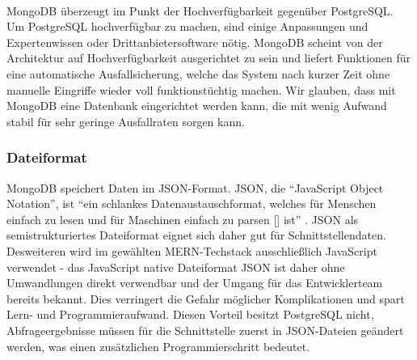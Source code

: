 \paragraph{}
MongoDB überzeugt im Punkt der Hochverfügbarkeit gegenüber PostgreSQL. Um PostgreSQL hochverfügbar zu machen, sind einige Anpassungen und Expertenwissen oder Drittanbietersoftware nötig. MongoDB scheint von der Architektur auf Hochverfügbarkeit ausgerichtet zu sein und liefert Funktionen für eine automatische Ausfallsicherung, welche das System nach kurzer Zeit ohne manuelle Eingriffe wieder voll funktionstüchtig machen. Wir glauben, dass mit MongoDB eine Datenbank eingerichtet werden kann, die mit wenig Aufwand stabil für sehr geringe Ausfallraten sorgen kann.

\subsubsection{Dateiformat}
MongoDB speichert Daten im JSON-Format. JSON, die \enquote{JavaScript Object Notation}, ist \enquote{ein schlankes Datenaustauschformat, welches für Menschen einfach zu lesen und für Maschinen einfach zu parsen [] ist} \cite{JSON1}. JSON als semistrukturiertes Dateiformat eignet sich daher gut für Schnittstellendaten.\\
Desweiteren wird im gewählten MERN-Techstack ausschließlich JavaScript verwendet - das JavaScript native Dateiformat JSON ist daher ohne Umwandlungen direkt verwendbar und der Umgang für das Entwicklerteam bereits bekannt. Dies verringert die Gefahr möglicher Komplikationen und spart Lern- und Programmieraufwand. Diesen Vorteil besitzt PostgreSQL nicht, Abfrageergebnisse müssen für die Schnittstelle zuerst in JSON-Dateien geändert werden, was einen zusätzlichen Programmierschritt bedeutet. 

